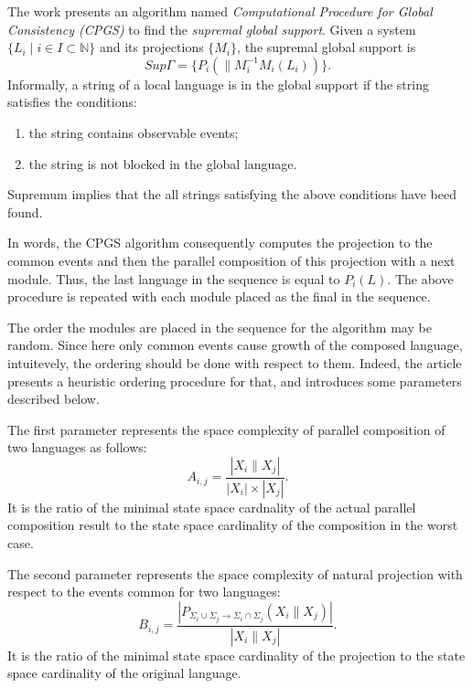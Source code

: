 \documentclass[a4paper, 10pt, conference]{ieeeconf}
\begin{document}
The work \cite{su_global_2005} presents an algorithm named \emph{Computational
Procedure for Global Consistency (CPGS)} to find the \emph{supremal
global support}. Given a system 
$\{ L_i \mid i \in I \subset \mathbb{N} \}$ 
and its projections $\{ M_i \}$, the supremal global support is
\begin{equation}
	Sup\Gamma = \{ P_i(\parallel M_i^{-1}M_i(L_i))\}.
\end{equation}
Informally, a string of a local language is in the global support if the string
satisfies the conditions:
\begin{enumerate}
  \item the string contains observable events;
  \item the string is not blocked in the global language. 
\end{enumerate}
Supremum implies that the all strings satisfying the above conditions have
beed found.

In words, the CPGS algorithm consequently computes the projection to the common
events and then the parallel composition of this projection with a next module.
Thus, the last language in the sequence is equal to $P_i(L)$. The above
procedure is repeated with each module placed as the final in the sequence.

The order the modules are placed in the sequence for the algorithm may be
random. Since here only common events cause growth of the composed language,
intuitevely, the ordering should be done with respect to them. Indeed, the
article presents a heuristic ordering procedure for that, and introduces some
parameters described below.

The first parameter represents the space complexity of parallel composition of
two languages as follows:
\begin{equation}
	A_{i,j} = \frac{| X_i \parallel X_j |}{|X_i|\times |X_j|}.
\end{equation}
It is the ratio of the minimal state space cardnality of the actual parallel
composition result to the state space cardinality of the composition in the
worst case.

The second parameter represents the space complexity of natural projection with
respect to the events common for two languages:
\begin{equation}
	B_{i,j} = \frac{
		| P_{\Sigma_i \cup \Sigma_j \rightarrow \Sigma_i \cap \Sigma_j}
		(X_i \parallel X_j) |}
		{| X_i \parallel X_j |}.
\end{equation}
It is the ratio of the minimal state space cardinality of the projection to the
state space cardinality of the original language.
\end{document}
